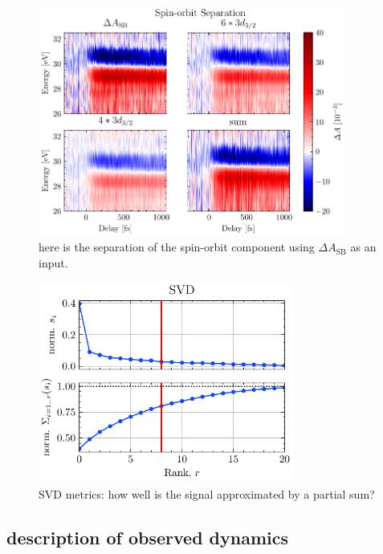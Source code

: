 \begin{figure}
	\centering
	\includegraphics[width=0.90\textwidth]{figures/chap4/OD_df_125Hz_Delay1-6_SO_sep_dASB.pdf}
	\caption{here is the separation of the spin-orbit component using $\Delta A_{\textrm{SB}}$ as an input.}
	\label{fig:OD_df_125Hz_Delay1-6_SO_sep_dASB}
\end{figure}

\begin{figure}
	\centering
	\includegraphics[width=0.75\textwidth]{figures/chap4/OD_df_125Hz_Delay1-6_SVD_qual.pdf}
	\caption{SVD metrics: how well is the signal approximated by a partial sum?}
	\label{fig:OD_df_125Hz_Delay1-6_SVD_qual}
\end{figure}

\subsection{description of observed dynamics}
